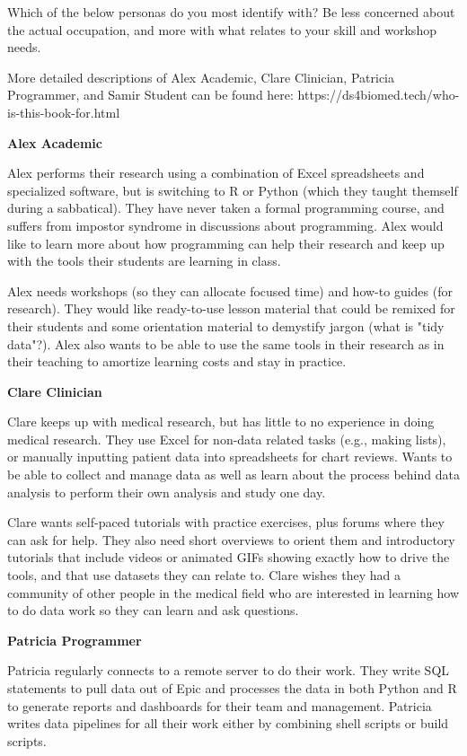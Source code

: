\documentclass[030-workshop.tex]{subfiles}
\begin{document}
Which of the below personas do you most identify with? Be less concerned about the actual occupation, and more with what relates to your skill and workshop needs.

More detailed descriptions of Alex Academic, Clare Clinician, Patricia Programmer, and Samir Student can be found here: https://ds4biomed.tech/who-is-this-book-for.html


\textbf{Alex Academic}

 Alex performs their research using a combination of Excel spreadsheets and specialized software,
 but is switching to R or Python (which they taught themself during a sabbatical).
 They have never taken a formal programming course, and suffers from impostor syndrome in discussions about programming.
 Alex would like to learn more about how programming can help their research and keep up with the tools their students are learning in class.

 Alex needs workshops (so they can allocate focused time) and how-to guides (for research).
 They would like ready-to-use lesson material that could be remixed for their students and some orientation material to demystify jargon (what is "tidy data"?).
 Alex also wants to be able to use the same tools in their research as in their teaching to amortize learning costs and stay in practice.

\textbf{Clare Clinician}

 Clare keeps up with medical research, but has little to no experience in doing medical research.
 They use Excel for non-data related tasks (e.g., making lists), or manually inputting patient data into spreadsheets for chart reviews.
 Wants to be able to collect and manage data as well as learn about the process behind data analysis to perform their own analysis and study one day.

Clare wants self-paced tutorials with practice exercises, plus forums where they can ask for help.
 They also need short overviews to orient them and introductory tutorials that include videos or animated GIFs showing exactly how to drive the tools,
 and that use datasets they can relate to.
 Clare wishes they had a community of other people in the medical field who are interested in learning how to do data work so they can learn and ask questions.

\textbf{Patricia Programmer}

 Patricia regularly connects to a remote server to do their work.
 They write SQL statements to pull data out of Epic and processes the data in both Python and R to generate reports and dashboards for their team and management.
 Patricia writes data pipelines for all their work either by combining shell scripts or build scripts.
\end{document}
